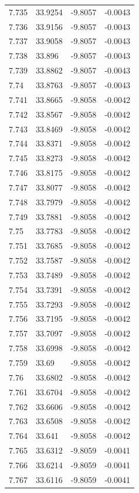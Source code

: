 \begin{tabular}{llll}
7.735 & 33.9254 & -9.8057 & -0.0043 \\
7.736 & 33.9156 & -9.8057 & -0.0043 \\
7.737 & 33.9058 & -9.8057 & -0.0043 \\
7.738 & 33.896 & -9.8057 & -0.0043 \\
7.739 & 33.8862 & -9.8057 & -0.0043 \\
7.74 & 33.8763 & -9.8057 & -0.0043 \\
7.741 & 33.8665 & -9.8058 & -0.0042 \\
7.742 & 33.8567 & -9.8058 & -0.0042 \\
7.743 & 33.8469 & -9.8058 & -0.0042 \\
7.744 & 33.8371 & -9.8058 & -0.0042 \\
7.745 & 33.8273 & -9.8058 & -0.0042 \\
7.746 & 33.8175 & -9.8058 & -0.0042 \\
7.747 & 33.8077 & -9.8058 & -0.0042 \\
7.748 & 33.7979 & -9.8058 & -0.0042 \\
7.749 & 33.7881 & -9.8058 & -0.0042 \\
7.75 & 33.7783 & -9.8058 & -0.0042 \\
7.751 & 33.7685 & -9.8058 & -0.0042 \\
7.752 & 33.7587 & -9.8058 & -0.0042 \\
7.753 & 33.7489 & -9.8058 & -0.0042 \\
7.754 & 33.7391 & -9.8058 & -0.0042 \\
7.755 & 33.7293 & -9.8058 & -0.0042 \\
7.756 & 33.7195 & -9.8058 & -0.0042 \\
7.757 & 33.7097 & -9.8058 & -0.0042 \\
7.758 & 33.6998 & -9.8058 & -0.0042 \\
7.759 & 33.69 & -9.8058 & -0.0042 \\
7.76 & 33.6802 & -9.8058 & -0.0042 \\
7.761 & 33.6704 & -9.8058 & -0.0042 \\
7.762 & 33.6606 & -9.8058 & -0.0042 \\
7.763 & 33.6508 & -9.8058 & -0.0042 \\
7.764 & 33.641 & -9.8058 & -0.0042 \\
7.765 & 33.6312 & -9.8059 & -0.0041 \\
7.766 & 33.6214 & -9.8059 & -0.0041 \\
7.767 & 33.6116 & -9.8059 & -0.0041 \\

\end{tabular}
